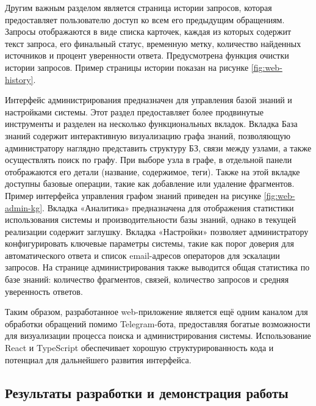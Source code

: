 
Другим важным разделом является страница истории запросов, которая предоставляет пользователю доступ ко всем его предыдущим обращениям. Запросы отображаются в виде списка карточек, каждая из которых содержит текст запроса, его финальный статус, временную метку, количество найденных источников и процент уверенности ответа. Предусмотрена функция очистки истории запросов. Пример страницы истории показан на рисунке \ref{fig:web-history}. 


Интерфейс администрирования предназначен для управления базой знаний и настройками системы. Этот раздел предоставляет более продвинутые инструменты и разделен на несколько функциональных вкладок. Вкладка База знаний содержит интерактивную визуализацию графа знаний, позволяющую администратору наглядно представить структуру БЗ, связи между узлами, а также осуществлять поиск по графу. При выборе узла в графе, в отдельной панели отображаются его детали (название, содержимое, теги). Также на этой вкладке доступны базовые операции, такие как добавление или удаление фрагментов. Пример интерфейса управления графом знаний приведен на рисунке \ref{fig:web-admin-kg}. Вкладка «Аналитика» предназначена для отображения статистики использования системы и производительности базы знаний, однако в текущей реализации содержит заглушку. Вкладка «Настройки» позволяет администратору конфигурировать ключевые параметры системы, такие как порог доверия для автоматического ответа и список email-адресов операторов для эскалации запросов. На странице администрирования также выводится общая статистика по базе знаний: количество фрагментов, связей, количество запросов и средняя уверенность ответов.


Таким образом, разработанное web-приложение является ещё одним каналом для обработки обращений помимо Telegram-бота, предоставляя богатые возможности для визуализации процесса поиска и администрирования системы. Использование React и TypeScript обеспечивает хорошую структурированность кода и потенциал для дальнейшего развития интерфейса.

\subsection{Результаты разработки и демонстрация работы}

